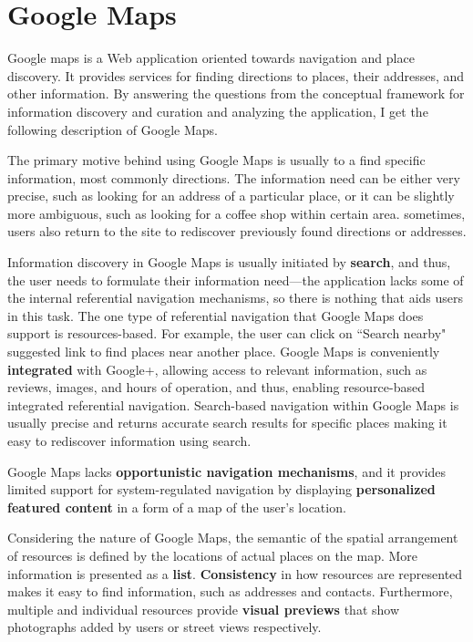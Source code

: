 {\section{Google Maps}
Google maps is a Web application oriented towards navigation and place discovery. It provides services for finding directions to places, their addresses, and other information. By answering the questions from the conceptual framework for information discovery and curation and analyzing the application, I get the following description of Google Maps.

The primary motive behind using Google Maps is usually to a find specific information, most commonly directions. The information need can be either very precise, such as looking for an address of a particular place, or it can be slightly more ambiguous, such as looking for a coffee shop within certain area. sometimes, users also return to the site to rediscover previously found directions or addresses.

Information discovery in Google Maps is usually initiated by \textbf{search}, and thus, the user needs to formulate their information need---the application lacks some of the internal referential navigation mechanisms, so there is nothing that aids users in this task. The one type of referential navigation that Google Maps does support is resources-based. For example, the user can click on ``Search nearby" suggested link to find places near another place. Google Maps is conveniently \textbf{integrated} with Google+, allowing access to relevant information, such as reviews, images, and hours of operation, and thus, enabling resource-based integrated referential navigation. Search-based navigation within Google Maps is usually precise and returns accurate search results for specific places making it easy to rediscover information using search. 

Google Maps lacks \textbf{opportunistic navigation mechanisms}, and it provides limited support for system-regulated navigation by displaying \textbf{personalized featured content} in a form of a map of the user's location.  

Considering the nature of Google Maps, the semantic of the spatial arrangement of resources is defined by the locations of actual places on the map. More information is presented as a \textbf{list}. \textbf{Consistency} in how resources are represented makes it easy to find information, such as addresses and contacts. Furthermore, multiple and individual resources provide \textbf{visual previews} that show photographs added by users or street views respectively.

}
